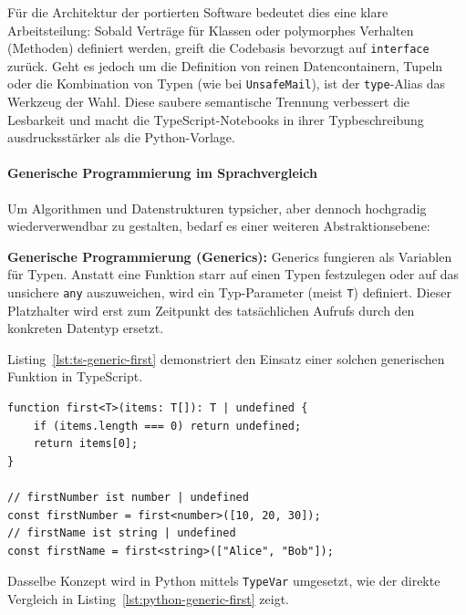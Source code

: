 Für die Architektur der portierten Software bedeutet dies eine klare Arbeitsteilung: Sobald Verträge für Klassen oder polymorphes Verhalten (Methoden) definiert werden, greift die Codebasis bevorzugt auf \texttt{interface} zurück. Geht es jedoch um die Definition von reinen Datencontainern, Tupeln oder die Kombination von Typen (wie bei \texttt{UnsafeMail}), ist der \texttt{type}-Alias das Werkzeug der Wahl. Diese saubere semantische Trennung verbessert die Lesbarkeit und macht die TypeScript-Notebooks in ihrer Typbeschreibung ausdrucksstärker als die Python-Vorlage.

\paragraph{Generische Programmierung im Sprachvergleich}
\label{par:generics-ts-python}

Um Algorithmen und Datenstrukturen typsicher, aber dennoch hochgradig wiederverwendbar zu gestalten, bedarf es einer weiteren Abstraktionsebene:

\begin{definition}
\label{def:ts-generics}
\textbf{Generische Programmierung (Generics):} Generics fungieren als Variablen für Typen. Anstatt eine Funktion starr auf einen Typen festzulegen oder auf das unsichere \texttt{any} auszuweichen, wird ein Typ-Parameter (meist \texttt{T}) definiert. Dieser Platzhalter wird erst zum Zeitpunkt des tatsächlichen Aufrufs durch den konkreten Datentyp ersetzt.
\end{definition}

Listing~\ref{lst:ts-generic-first} demonstriert den Einsatz einer solchen generischen Funktion in TypeScript.

\begin{listing}[htbp]
    \caption{Eine generische Funktion in TypeScript}
    \label{lst:ts-generic-first}
    \begin{verbatim}
function first<T>(items: T[]): T | undefined {
    if (items.length === 0) return undefined;
    return items[0];
}

// firstNumber ist number | undefined
const firstNumber = first<number>([10, 20, 30]);
// firstName ist string | undefined
const firstName = first<string>(["Alice", "Bob"]);
    \end{verbatim}
\end{listing}

Dasselbe Konzept wird in Python mittels \texttt{TypeVar} umgesetzt, wie der direkte Vergleich in Listing~\ref{lst:python-generic-first} zeigt.


